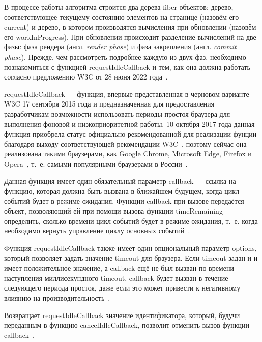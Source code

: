 В процессе работы алгоритма строится два дерева fiber объектов: дерево, соответствующее текущему состоянию элементов на странице (назовём его current) и дерево, в котором производятся вычисления при обновлении (назовём его workInProgress). 
При обновлении происходит разделение вычислений на две фазы: фаза рендера (англ. \textit{render phase}) и фаза закрепления (англ. \textit{commit phase}). 
Прежде, чем рассмотреть подробнее каждую из двух фаз, необходимо познакомиться с функцией requestIdleCallback и тем, как она должна работать согласно предложению W3C от 28 июня 2022 года~\cite{requestidlecallback}.


requestIdleCallback --- функция, впервые представленная в черновом варианте~\cite{requestidlecallback-old} W3C 17 сентября 2015 года и предназначенная для предоставления разработчикам возможности использовать периоды простоя браузера для выполнения фоновой и низкоприоритетной работы. 
10 октября 2017 года данная функция приобрела статус официально рекомендованной для реализации фунции благодаря выходу соответствующей рекомендации W3C~\cite{requestidlecallback-recommended}, поэтому сейчас она реализована такими браузерами, как Google Chrome, Microsoft Edge, Firefox и Opera~\cite{requestidlecallback-mdn}, т.~е. самыми популярными браузерами в России~\cite{browser-popularity-russia}.

Данная функция имеет один обязательный параметр callback --- ссылка на функцию, которая должна быть вызвана в ближайшем будущем, когда цикл событий будет в режиме ожидания. 
Функции callback при вызове передаётся объект, позволяющий ей при помощи вызова функции timeRemaining определить, сколько времени цикл событий будет в режиме ожидания, т.~е. когда необходимо вернуть управление циклу основных событий~\cite{requestidlecallback-time-remaining}.

Функция requestIdleCallback также имеет один опциональный параметр options, который позволяет задать значение timeout для браузера.
Если timeout задан и и имеет положительное значение, а callback ещё не был вызван по времени наступления миллисекундного timeout, callback будет вызван в течение следующего периода простоя, даже если это может привести к негативному влиянию на производительность~\cite{requestidlecallback-mdn}.

Возвращает requestIdleCallback значение идентификатора, который, будучи переданным в функцию cancelIdleCallback, позволит отменить вызов функции callback~\cite{requestidlecallback-recommended}.


